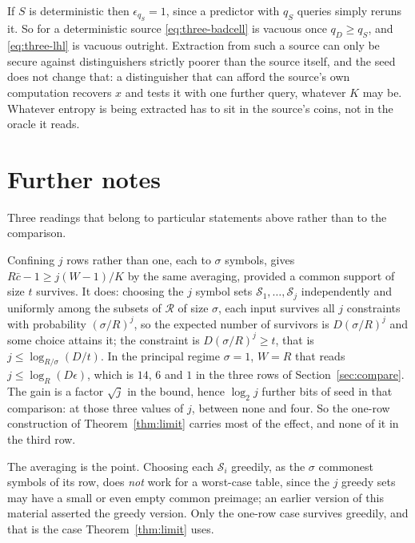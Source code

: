 \documentclass{aicr-solution}
\newcommand{\calR}{\mathcal{R}}
\newcommand{\calS}{\mathcal{S}}
\begin{document}
\begin{remark}\label{rem:det}
If $S$ is deterministic then $\epsilon_{q_S} = 1$, since a predictor with $q_S$ queries simply reruns
it. So for a deterministic source \eqref{eq:three-badcell} is vacuous once $q_D \ge q_S$, and
\eqref{eq:three-lhl} is vacuous outright. Extraction from such a source can only be secure against
distinguishers strictly poorer than the source itself, and the seed does not change that: a
distinguisher that can afford the source's own computation recovers $x$ and tests it with one
further query, whatever $K$ may be. Whatever entropy is being extracted has to sit in the source's
coins, not in the oracle it reads.
\end{remark}

\section{Further notes}\label{sec:notes}

Three readings that belong to particular statements above rather than to the comparison.

\begin{remark}\label{rem:multi}
Confining $j$ rows rather than one, each to $\sigma$ symbols, gives $R\bar c - 1 \ge j(W-1)/K$ by
the same averaging, provided a common support of size $t$ survives. It does: choosing the $j$ symbol
sets $\calS_1,\dots,\calS_j$ independently and uniformly among the subsets of $\calR$ of size
$\sigma$, each input survives all $j$ constraints with probability $(\sigma/R)^{j}$, so the expected
number of survivors is $D(\sigma/R)^{j}$ and some choice attains it; the constraint is
$D(\sigma/R)^{j} \ge t$, that is $j \le \log_{R/\sigma}(D/t)$. In the principal regime
$\sigma = 1$, $W = R$ that reads $j \le \log_R(D\epsilon)$, which is $14$, $6$ and $1$ in the three
rows of Section~\ref{sec:compare}. The gain is a factor $\sqrt{j}$ in the
bound, hence $\log_2 j$ further bits of seed in that comparison: at those three values of $j$,
between none and four. So the one-row construction of Theorem~\ref{thm:limit} carries most of the
effect, and none of it in the third row.

The averaging is the point. Choosing each $\calS_i$ greedily, as the $\sigma$ commonest symbols of
its row, does \emph{not} work for a worst-case table, since the $j$ greedy sets may have a small or
even empty common preimage; an earlier version of this material asserted the greedy version. Only the
one-row case survives greedily, and that is the case Theorem~\ref{thm:limit} uses.
\end{remark}
\end{document}
